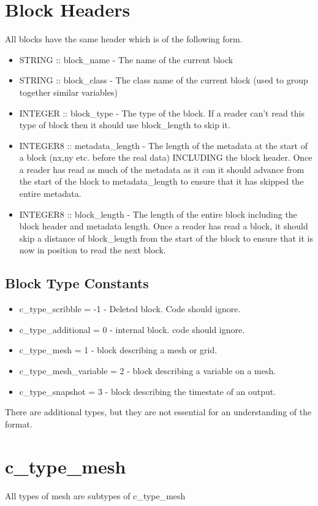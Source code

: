 \documentclass[8pt]{article}
\begin{document}
\section{Block Headers}
All blocks have the same header which is of the following form.\\
\begin{itemize}
\item STRING :: block\_name - The name of the current block
\item STRING :: block\_class - The class name of the current block (used to group together similar variables)
\item INTEGER :: block\_type - The type of the block. If a reader can't read this type of block then it should use block\_length to skip it.
\item INTEGER8 :: metadata\_length - The length of the metadata at the start of a block (nx,ny etc. before the real data) INCLUDING the block header. Once a reader has read as much of the metadata as it can it should advance from the start of the block to metadata\_length to ensure that it has skipped the entire metadata.
\item INTEGER8 :: block\_length - The length of the entire block including the block header and metadata length. Once a reader has read a block, it should skip a distance of block\_length from the start of the block to ensure that it is now in position to read the next block.
\end{itemize}
\subsection{Block Type Constants}
\begin{itemize}
  \item c\_type\_scribble = -1 - Deleted block. Code should ignore.
  \item c\_type\_additional = 0 - internal block. code should ignore.
  \item c\_type\_mesh = 1 - block describing a mesh or grid.
  \item c\_type\_mesh\_variable = 2 - block describing a variable on a mesh.
  \item c\_type\_snapshot = 3 - block describing the timestate of an output.
\end{itemize}
There are additional types, but they are not essential for an understanding of the format.
\section{c\_type\_mesh}
All types of mesh are subtypes of c\_type\_mesh
\end{document}
